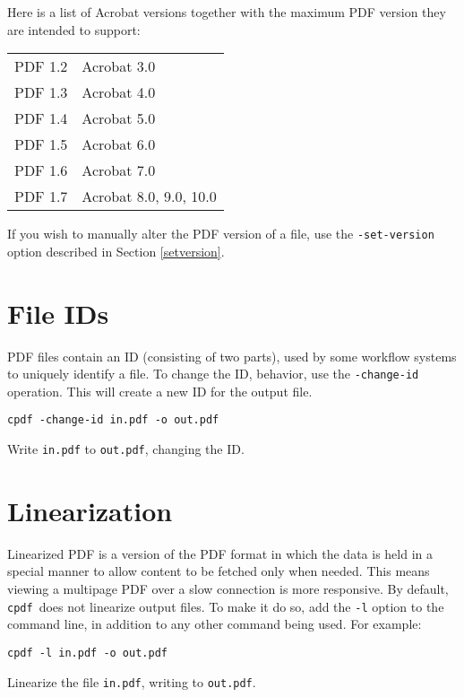 \documentclass{book}
\newcommand{\cpdf}{\texttt{cpdf}}
\begin{document}
Here is a list of Acrobat versions together with the maximum PDF version they
are intended to support:

\vspace{2mm}
  \begin{tabular}{rl}
     PDF 1.2 & Acrobat 3.0 \\
     PDF 1.3 & Acrobat 4.0 \\
     PDF 1.4 & Acrobat 5.0 \\
     PDF 1.5 & Acrobat 6.0 \\
     PDF 1.6 & Acrobat 7.0 \\
     PDF 1.7 & Acrobat 8.0, 9.0, 10.0
  \end{tabular}
\vspace{2mm}

\noindent If you wish to manually alter the PDF version of a file, use the
\texttt{-set-version} option described in Section \ref{setversion}.

\section{File IDs}
PDF files contain an ID (consisting of two parts), used by some workflow
systems to uniquely identify a file. To change the ID, behavior, use the
\texttt{-change-id} operation. This will create a new ID for the output file. 

\begin{framed}
\small\verb!cpdf -change-id in.pdf -o out.pdf!

\vspace{2.5mm}
\noindent Write \texttt{in.pdf} to \texttt{out.pdf}, changing the ID.
\end{framed}

\section{Linearization}
Linearized PDF is a version of the PDF format in which the data is held in a
special manner to allow content to be fetched only when needed. This means
viewing a multipage PDF over a slow connection is more responsive. By default,
\cpdf\ does not linearize output files. To make it do so, add the \texttt{-l}
option to the command line, in addition to any other command being used. For example:

\begin{framed}
\small\verb!cpdf -l in.pdf -o out.pdf!

\vspace{2.5mm}
\noindent Linearize the file \texttt{in.pdf}, writing to \texttt{out.pdf}.
\end{framed}
\end{document}
